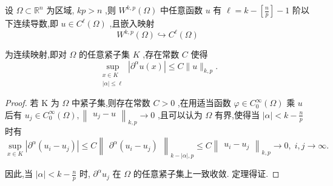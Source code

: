 \documentclass[lang=cn,newtx,10pt,scheme=chinese,thmcnt=chapter]{elegantbook}
\begin{document}
\begin{theorem}
      设 \(\Omega  \subset  {\mathbb{R}}^{n}\) 为区域, \({kp} > n\) ,则 \({W}^{k,p}\left( \Omega \right)\) 中任意函数 \(u\) 有 \(\ell  = k - \left\lbrack  \frac{n}{p}\right\rbrack   - 1\) 阶以下连续导数,即 \(u \in  {C}^{\ell }\left( \Omega \right)\) ,且嵌入映射
\begin{equation}
{W}^{k,p}\left( \Omega \right)  \hookrightarrow  {C}^{\ell }\left( \Omega \right)  \label{3.42}
\end{equation}

为连续映射,即对 \(\Omega\) 的任意紧子集 \(K\) ,存在常数 \(C\) 使得
\begin{equation*}
\mathop{\sup }\limits_{\substack{{x \in  K} \\  {\left| \alpha \right|  \leqslant  \ell } }}\left| {{\partial }^{\alpha }u\left( x\right) }\right|  \leqslant  C\parallel u{\parallel }_{k,p}.
\end{equation*}

\end{theorem}
\begin{proof}
    若 \(\mathrm{K}\) 为 \(\Omega\) 中紧子集,则存在常数 \(C > 0\) ,在用适当函数 \(\varphi  \in  {C}_{0}^{\infty }\left( \Omega \right)\) 乘 \(u\) 后有 \({u}_{j} \in  {C}_{0}^{\infty }\left( \Omega \right) ,{\begin{Vmatrix}{u}_{j} - u\end{Vmatrix}}_{k,p} \rightarrow  0\) ,且可以认为 \(\Omega\) 有界,使得当 \(\left| \alpha \right|  < k - \frac{n}{p}\) 时有
\begin{equation*}
\mathop{\sup }\limits_{{x \in  K}}\left| {{\partial }^{\alpha }\left( {{u}_{i} - {u}_{j}}\right) }\right|  \leqslant  C{\begin{Vmatrix}{\partial }^{\alpha }\left( {u}_{i} - {u}_{j}\right) \end{Vmatrix}}_{k - \left| \alpha \right| ,p}
\leqslant  C{\begin{Vmatrix}{u}_{i} - {u}_{j}\end{Vmatrix}}_{k,p} \rightarrow  0,\;i,j \rightarrow  \infty .
\end{equation*}

因此,当 \(\left| \alpha \right|  < k - \frac{n}{p}\) 时, \({\partial }^{\alpha }{u}_{j}\) 在 \(\Omega\) 的任意紧子集上一致收敛. 定理得证.
\end{proof}
\end{document}
